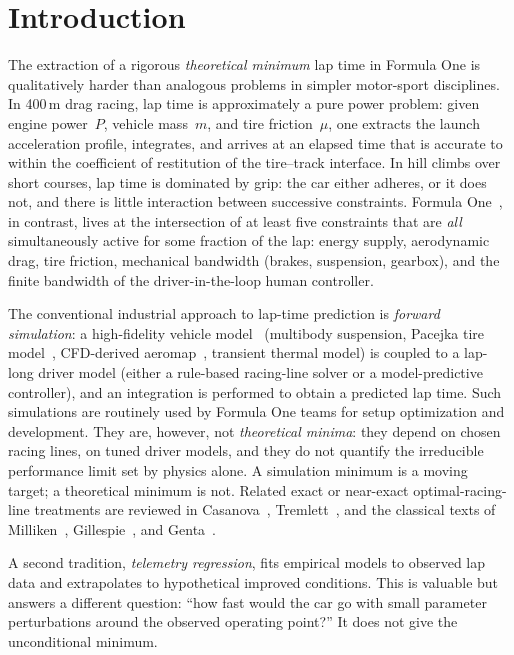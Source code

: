\documentclass[11pt,twocolumn]{article}
\theoremstyle{definition}
\theoremstyle{remark}
\begin{document}
\section{Introduction}
\label{sec:introduction}

The extraction of a rigorous \emph{theoretical minimum} lap time in Formula One
is qualitatively harder than analogous problems in simpler motor-sport
disciplines. In 400\,m drag racing, lap time is approximately a pure power
problem: given engine power~$P$, vehicle mass~$m$, and tire friction~$\mu$, one
extracts the launch acceleration profile, integrates, and arrives at an elapsed
time that is accurate to within the coefficient of restitution of the tire--track
interface. In hill climbs over short courses, lap time is dominated by grip: the
car either adheres, or it does not, and there is little interaction between
successive constraints. Formula One~\cite{wright2001,tremayne2015,bower2014,smith2010,beckman1991,katz2016},
in contrast, lives at the intersection of at least five constraints that are \emph{all} simultaneously active for some
fraction of the lap: energy supply, aerodynamic drag, tire friction, mechanical
bandwidth (brakes, suspension, gearbox), and the finite bandwidth of the
driver-in-the-loop human controller.

The conventional industrial approach to lap-time prediction is \emph{forward
simulation}: a high-fidelity vehicle model~\cite{milliken1995,gillespie1992,rajamani2012}
(multibody suspension, Pacejka tire model~\cite{pacejka1987,pacejka2012},
CFD-derived aeromap~\cite{katz1995,anderson2017,zhang2006}, transient thermal
model) is coupled to a lap-long driver model (either a rule-based racing-line solver or a
model-predictive controller), and an integration is performed to obtain a
predicted lap time. Such simulations are routinely used by Formula One teams
for setup optimization and development. They are, however, not \emph{theoretical
minima}: they depend on chosen racing lines, on tuned driver models, and they
do not quantify the irreducible performance limit set by physics alone. A
simulation minimum is a moving target; a theoretical minimum is not. Related
exact or near-exact optimal-racing-line treatments are reviewed in
Casanova~\cite{casanova2000}, Tremlett~\cite{tremlett2015}, and the classical
texts of Milliken~\cite{milliken1995}, Gillespie~\cite{gillespie1992}, and
Genta~\cite{genta1997}.

A second tradition, \emph{telemetry regression}, fits empirical models to
observed lap data and extrapolates to hypothetical improved conditions. This
is valuable but answers a different question: ``how fast would the car go with
small parameter perturbations around the observed operating point?'' It does
not give the unconditional minimum.
\end{document}
